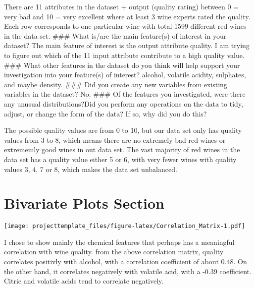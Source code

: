 \documentclass[]{article}
\begin{document}
There are 11 attributes in the dataset + output (quality rating) between
0 = very bad and 10 = very excellent where at least 3 wine experts rated
the quality. Each row corresponds to one particular wine with total 1599
different red wines in the data set. \#\#\# What is/are the main
feature(s) of interest in your dataset? The main feature of interest is
the output attribute quality. I am trying to figure out which of the 11
input attribute contribute to a high quality value. \#\#\# What other
features in the dataset do you think will help support your
investigation into your feature(s) of interest? alcohol, volatile
acidity, sulphates, and maybe density. \#\#\# Did you create any new
variables from existing variables in the dataset? No. \#\#\# Of the
features you investigated, were there any unusual distributions?Did you
perform any operations on the data to tidy, adjust, or change the form
of the data? If so, why did you do this?

The possible quality values are from 0 to 10, but our data set only has
quality values from 3 to 8, which means there are no extremely bad red
wines or extrememly good wines in out data set. The vast majority of red
wines in the data set has a quality value either 5 or 6, with very fewer
wines with quality values 3, 4, 7 or 8, which makes the data set
unbalanced.

\section{Bivariate Plots Section}\label{bivariate-plots-section}

\texttt{[image: projecttemplate\_files/figure-latex/Correlation\_Matrix-1.pdf]}

I chose to show mainly the chemical features that perhaps has a
meaningful correlation with wine quality. from the above correlation
matrix, quality correlates positivly with alcohol, with a correlation
coefficient of about 0.48. On the other hand, it correlates negatively
with volatile acid, with a -0.39 coefficient. Citric and volatile acids
tend to correlate negatively.
\end{document}
